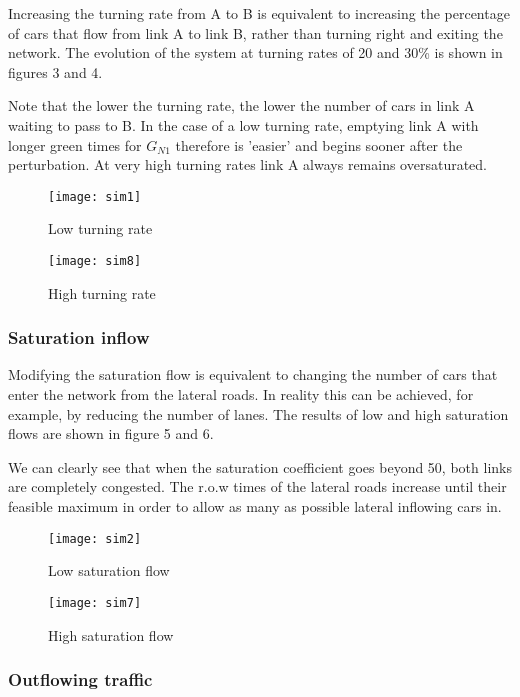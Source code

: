 \documentclass[11pt]{article}
\begin{document}
Increasing the turning rate from A to B is equivalent to increasing the percentage of cars that flow from link A to link B, rather than turning right and exiting the network. The evolution of the system at turning rates of 20 and 30\% is shown in figures 3 and 4.

Note that the lower the turning rate, the lower the number of cars in link A waiting to pass to B. In the case of a low turning rate, emptying link A with longer green times for $G_{N1}$ therefore is 'easier' and begins sooner after the perturbation. At very high turning rates link A always remains oversaturated. %

\begin{figure}[h!]
    \caption{Low turning rate}
      \centering
	\texttt{[image: sim1]}
\end{figure}

\begin{figure}[h!]
    \caption{High turning rate}
      \centering
	\texttt{[image: sim8]}
\end{figure}


\subsubsection{Saturation inflow}

Modifying the saturation flow is equivalent to changing the number of cars that enter the network from the lateral roads. In reality this can be achieved, for example, by reducing the number of lanes. The results of low and high saturation flows are shown in figure 5 and 6.

We can clearly see that when the saturation coefficient goes beyond 50, both links are completely congested. The r.o.w times of the lateral roads increase until their feasible maximum in order to allow as many as possible lateral inflowing cars in.

\begin{figure}[h!]
    \caption{Low saturation flow}
      \centering
	\texttt{[image: sim2]}
\end{figure}

\begin{figure}[h!]

    \caption{High saturation flow}
      \centering
	\texttt{[image: sim7]}
\end{figure}

\subsubsection{Outflowing traffic}
\end{document}
